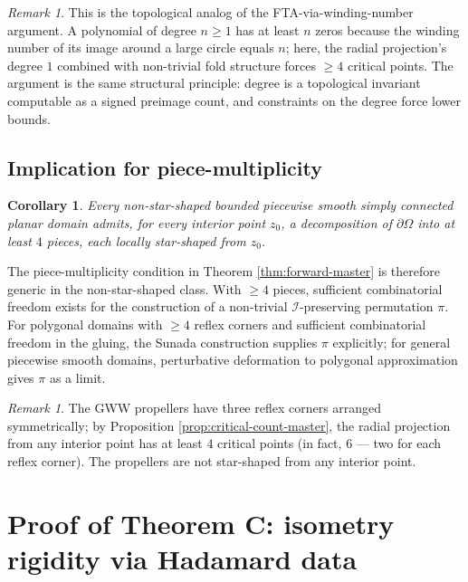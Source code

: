 \documentclass[11pt,reqno]{amsart}
\theoremstyle{plain}
\newtheorem{corollary}[theorem]{Corollary}
\theoremstyle{definition}
\theoremstyle{remark}
\newtheorem{remark}[theorem]{Remark}
\newcommand{\Icalbb}{\mathcal{I}}
\begin{document}
\begin{remark}\label{rem:fta-analogy-master}
This is the topological analog of the FTA-via-winding-number argument. A polynomial of degree $n \geq 1$ has at least $n$ zeros because the winding number of its image around a large circle equals $n$; here, the radial projection's degree $1$ combined with non-trivial fold structure forces $\geq 4$ critical points. The argument is the same structural principle: degree is a topological invariant computable as a signed preimage count, and constraints on the degree force lower bounds.
\end{remark}

\subsection{Implication for piece-multiplicity}\label{ss:piece-mult-master}

\begin{corollary}\label{cor:piece-mult-master}
Every non-star-shaped bounded piecewise smooth simply connected planar domain admits, for every interior point $z_0$, a decomposition of $\partial\Omega$ into at least $4$ pieces, each locally star-shaped from $z_0$.
\end{corollary}

The piece-multiplicity condition in Theorem \ref{thm:forward-master} is therefore generic in the non-star-shaped class. With $\geq 4$ pieces, sufficient combinatorial freedom exists for the construction of a non-trivial $\Icalbb$-preserving permutation $\pi$. For polygonal domains with $\geq 4$ reflex corners and sufficient combinatorial freedom in the gluing, the Sunada construction supplies $\pi$ explicitly; for general piecewise smooth domains, perturbative deformation to polygonal approximation gives $\pi$ as a limit.

\begin{remark}\label{rem:gww-not-star-master}
The GWW propellers have three reflex corners arranged symmetrically; by Proposition \ref{prop:critical-count-master}, the radial projection from any interior point has at least $4$ critical points (in fact, $6$ — two for each reflex corner). The propellers are not star-shaped from any interior point.
\end{remark}

\section{Proof of Theorem C: isometry rigidity via Hadamard data}\label{sec:hadamard}
\end{document}

